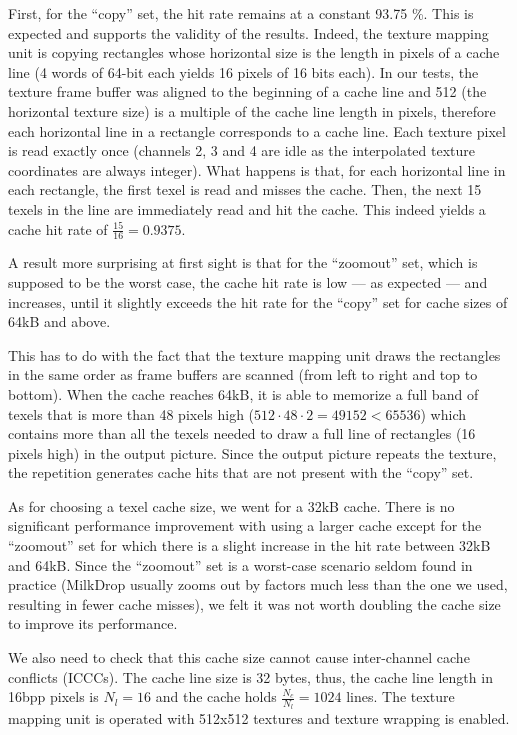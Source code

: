 \documentclass[a4paper,11pt]{kthesis}
\begin{document}
First, for the ``copy'' set, the hit rate remains at a constant 93.75 \%. This is expected and supports the validity of the results. Indeed, the texture mapping unit is copying rectangles whose horizontal size is the length in pixels of a cache line (4 words of 64-bit each yields 16 pixels of 16 bits each). In our tests, the texture frame buffer was aligned to the beginning of a cache line and 512 (the horizontal texture size) is a multiple of the cache line length in pixels, therefore each horizontal line in a rectangle corresponds to a cache line. Each texture pixel is read exactly once (channels 2, 3 and 4 are idle as the interpolated texture coordinates are always integer). What happens is that, for each horizontal line in each rectangle, the first texel is read and misses the cache. Then, the next 15 texels in the line are immediately read and hit the cache. This indeed yields a cache hit rate of $\frac{15}{16} = 0.9375$.

A result more surprising at first sight is that for the ``zoomout'' set, which is supposed to be the worst case, the cache hit rate is low --- as expected --- and increases, until it slightly exceeds the hit rate for the ``copy'' set for cache sizes of 64kB and above.

This has to do with the fact that the texture mapping unit draws the rectangles in the same order as frame buffers are scanned (from left to right and top to bottom). When the cache reaches 64kB, it is able to memorize a full band of texels that is more than 48 pixels high ($512\cdot48\cdot2 = 49152 < 65536$) which contains more than all the texels needed to draw a full line of rectangles (16 pixels high) in the output picture. Since the output picture repeats the texture, the repetition generates cache hits that are not present with the ``copy'' set.

As for choosing a texel cache size, we went for a 32kB cache. There is no significant performance improvement with using a larger cache except for the ``zoomout'' set for which there is a slight increase in the hit rate between 32kB and 64kB. Since the ``zoomout'' set is a worst-case scenario seldom found in practice (MilkDrop usually zooms out by factors much less than the one we used, resulting in fewer cache misses), we felt it was not worth doubling the cache size to improve its performance.

We also need to check that this cache size cannot cause inter-channel cache conflicts (ICCCs). The cache line size is 32 bytes, thus, the cache line length in 16bpp pixels is $N_{l} = 16$ and the cache holds $\frac{N_{c}}{N_{l}}=1024$ lines. The texture mapping unit is operated with 512x512 textures and texture wrapping is enabled.
\end{document}
